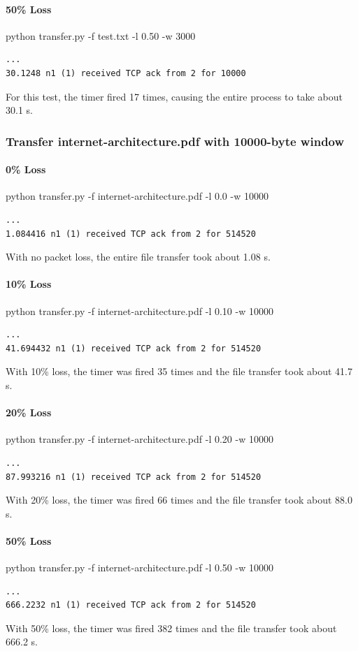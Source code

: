 \documentclass[11pt]{article}
\begin{document}
\paragraph{50\% Loss}
python transfer.py -f test.txt -l 0.50 -w 3000
\begin{lstlisting}
...
30.1248 n1 (1) received TCP ack from 2 for 10000
\end{lstlisting}
For this test, the timer fired 17 times, causing the entire process to take about 30.1 s.
\subsubsection{Transfer internet-architecture.pdf with 10000-byte window}
\paragraph{0\% Loss}
python transfer.py -f internet-architecture.pdf -l 0.0 -w 10000
\begin{lstlisting}
...
1.084416 n1 (1) received TCP ack from 2 for 514520
\end{lstlisting}
With no packet loss, the entire file transfer took about 1.08 s.
\paragraph{10\% Loss}
python transfer.py -f internet-architecture.pdf -l 0.10 -w 10000
\begin{lstlisting}
...
41.694432 n1 (1) received TCP ack from 2 for 514520
\end{lstlisting}
With 10\% loss, the timer was fired 35 times and the file transfer took about 41.7 s.
\paragraph{20\% Loss}
python transfer.py -f internet-architecture.pdf -l 0.20 -w 10000
\begin{lstlisting}
...
87.993216 n1 (1) received TCP ack from 2 for 514520
\end{lstlisting}
With 20\% loss, the timer was fired 66 times and the file transfer took about 88.0 s.
\paragraph{50\% Loss}
python transfer.py -f internet-architecture.pdf -l 0.50 -w 10000
\begin{lstlisting}
...
666.2232 n1 (1) received TCP ack from 2 for 514520
\end{lstlisting}
With 50\% loss, the timer was fired 382 times and the file transfer took about 666.2 s.
\end{document}
